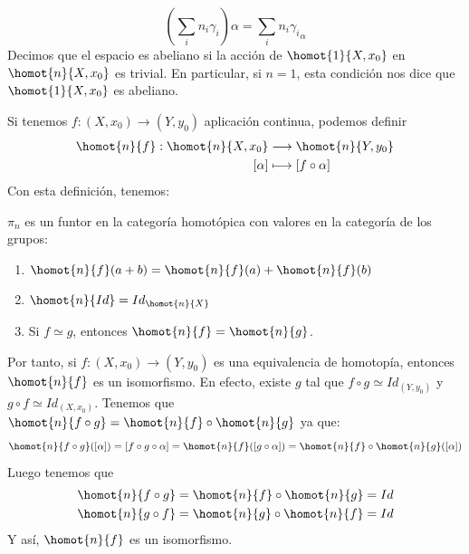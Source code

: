 \[
\left( \sum_i n_i \gamma_i \right) \alpha = \sum_i n_i {\gamma_i}_\alpha
\]
Decimos que el espacio es abeliano si la acción de $\homot{1}{X, x_0}$ en $\homot{n}{X, x_0}$ es trivial. En particular, si $n=1$, esta condición nos dice que $\homot{1}{X, x_0}$ es abeliano. \par
Si tenemos $f : (X, x_0) \longrightarrow (Y, y_0)$ aplicación continua, podemos definir
\begin{align*}
\homot{n}{f} : \homot{n}{X, x_0} &\longrightarrow \homot{n}{Y, y_0} \\
[\alpha] & \longmapsto [f \circ \alpha]
\end{align*}
Con esta definición, tenemos:
\begin{prop}
$\pi_n$ es un funtor en la categoría homotópica con valores en la categoría de los grupos:
\begin{enumerate}
\item $\homot{n}{f}(a+b) = \homot{n}{f}(a) + \homot{n}{f}(b)$
\item $\homot{n}{Id} = Id_{\homot{n}{X}}$
\item Si $f \simeq g$, entonces $\homot{n}{f} = \homot{n}{g}$.
\end{enumerate}
\end{prop}
Por tanto, si $f : (X, x_0) \longrightarrow (Y, y_0)$ es una equivalencia de homotopía, entonces $\homot{n}{f}$ es un isomorfismo. En efecto, existe $g$ tal que $f \circ g \simeq Id_{(Y, y_0)}$ y $g \circ f \simeq Id_{(X, x_0)}$. Tenemos que $\homot{n}{f \circ g} = \homot{n}{f} \circ \homot{n}{g}$ ya que:
\[
\homot{n}{f \circ g}([\alpha]) = [f \circ g \circ \alpha] = \homot{n}{f}([g \circ \alpha]) = \homot{n}{f} \circ \homot{n}{g}([\alpha])
\]
Luego tenemos que 
\begin{align*}
\homot{n}{f \circ g} = \homot{n}{f} \circ \homot{n}{g} = Id \\
\homot{n}{g \circ f} = \homot{n}{g} \circ \homot{n}{f} = Id
\end{align*}
Y así, $\homot{n}{f}$ es un isomorfismo.
